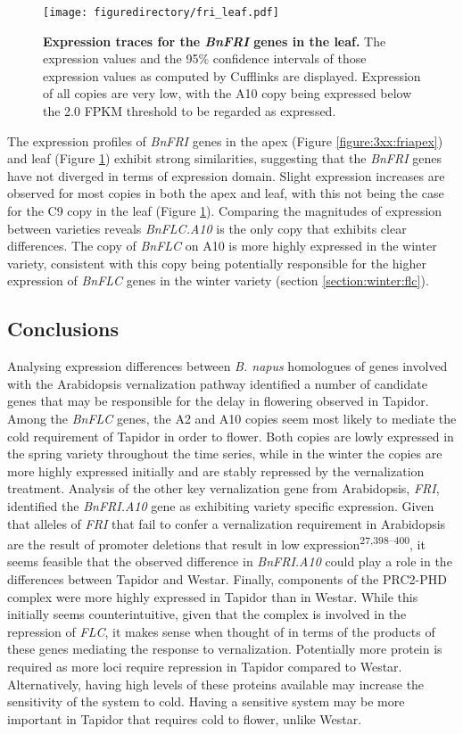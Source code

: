 \documentclass[12pt,]{book}
\begin{document}
\begin{figure}[htbp]
\centering
\texttt{[image: figuredirectory/fri\_leaf.pdf]}
\caption{\textbf{Expression traces for the \emph{BnFRI} genes in the
leaf.} The expression values and the 95\% confidence intervals of those
expression values as computed by Cufflinks are displayed. Expression of
all copies are very low, with the A10 copy being expressed below the 2.0
FPKM threshold to be regarded as expressed.}\label{figure:3xx:frileaf}
\end{figure}

The expression profiles of \emph{BnFRI} genes in the apex (Figure
\ref{figure:3xx:friapex}) and leaf (Figure \ref{figure:3xx:frileaf})
exhibit strong similarities, suggesting that the \emph{BnFRI} genes have
not diverged in terms of expression domain. Slight expression increases
are observed for most copies in both the apex and leaf, with this not
being the case for the C9 copy in the leaf (Figure
\ref{figure:3xx:frileaf}). Comparing the magnitudes of expression
between varieties reveals \emph{BnFLC.A10} is the only copy that
exhibits clear differences. The copy of \emph{BnFLC} on A10 is more
highly expressed in the winter variety, consistent with this copy being
potentially responsible for the higher expression of \emph{BnFLC} genes
in the winter variety (section \ref{section:winter:flc}).

\subsection{Conclusions}\label{conclusions-5}

Analysing expression differences between \emph{B. napus} homologues of
genes involved with the Arabidopsis vernalization pathway identified a
number of candidate genes that may be responsible for the delay in
flowering observed in Tapidor. Among the \emph{BnFLC} genes, the A2 and
A10 copies seem most likely to mediate the cold requirement of Tapidor
in order to flower. Both copies are lowly expressed in the spring
variety throughout the time series, while in the winter the copies are
more highly expressed initially and are stably repressed by the
vernalization treatment. Analysis of the other key vernalization gene
from Arabidopsis, \emph{FRI}, identified the \emph{BnFRI.A10} gene as
exhibiting variety specific expression. Given that alleles of \emph{FRI}
that fail to confer a vernalization requirement in Arabidopsis are the
result of promoter deletions that result in low
expression\textsuperscript{27,398--400}, it seems feasible that the
observed difference in \emph{BnFRI.A10} could play a role in the
differences between Tapidor and Westar. Finally, components of the
PRC2-PHD complex were more highly expressed in Tapidor than in Westar.
While this initially seems counterintuitive, given that the complex is
involved in the repression of \emph{FLC}, it makes sense when thought of
in terms of the products of these genes mediating the response to
vernalization. Potentially more protein is required as more loci require
repression in Tapidor compared to Westar. Alternatively, having high
levels of these proteins available may increase the sensitivity of the
system to cold. Having a sensitive system may be more important in
Tapidor that requires cold to flower, unlike Westar.
\end{document}
